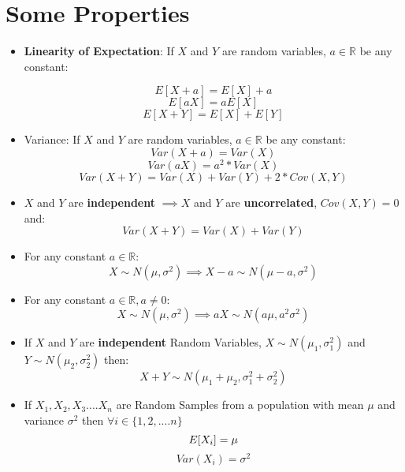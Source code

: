 \section*{Some Properties}

\begin{itemize}

\item 
\textbf{Linearity of Expectation}: If $X$ and $Y$ are random variables, $a \in \mathbb{R}$ be any constant:

\begin{equation}
E[X + a] = E[X] + a
\end{equation}
\begin{equation}
E[aX] = aE[X]
\end{equation}
\begin{equation}
E[X + Y] = E[X] + E[Y]
\end{equation}

\item 
Variance: If $X$ and $Y$ are random variables, $a \in \mathbb{R}$ be any constant: 
\begin{equation}
Var(X + a) = Var(X)
\end{equation}
\begin{equation}
Var(aX) = a^2 * Var(X)
\end{equation}
\begin{equation}
Var(X + Y) = Var(X) + Var(Y) + 2 * Cov(X,Y)
\end{equation}

\item
$X$ and $Y$ are \textbf{independent} $\implies X$ and $Y$ are \textbf{uncorrelated}, $Cov(X,Y) = 0$ and:
\begin{equation}
Var(X + Y) = Var(X) + Var(Y)
\end{equation}


\item 
For any constant $a \in \mathbb{R}$:
\begin{equation}
X \sim N(\mu , \sigma^2) \implies X - a \sim N(\mu - a , \sigma^2)
\end{equation}

 \item
For any constant $a \in \mathbb{R} , a\neq 0$:
\begin{equation}
X \sim N(\mu , \sigma^2) \implies aX \sim N(a\mu  , a^2 \sigma^2)
\end{equation}

 \item
If $X$ and $Y$ are \textbf{independent} Random Variables, $X \sim N(\mu_1 , \sigma^2_1)$ and $Y \sim N(\mu_2 , \sigma^2_2)$ then:
\begin{equation}
X + Y \sim N(\mu_1 + \mu_2 , \sigma^2_1 + \sigma^2_2)
\end{equation}



\item
If $X_1 , X_2 , X_3....X_n$ are Random Samples from a population with mean $\mu$ and variance $\sigma^2$ then  $\forall i \in \{1 , 2,....n\}$ 
\begin{equation}
E[X_i] = \mu\\ 
\end{equation}
\begin{equation}
Var(X_i) = \sigma^2
\end{equation}

\end{itemize}